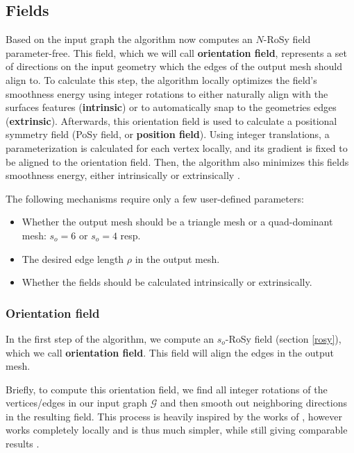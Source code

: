 \documentclass{ACGSeminar}
\begin{document}
\subsection{Fields}
Based on the input graph the algorithm now computes an $N$-RoSy field parameter-free. This field, which we will call \textbf{orientation field}, represents a set of directions on the input geometry which the edges of the output mesh should align to. To calculate this step, the algorithm locally optimizes the field's smoothness energy using integer rotations to either naturally align with the surfaces features (\textbf{intrinsic}) or to automatically snap to the geometries edges (\textbf{extrinsic}). Afterwards, this orientation field is used to calculate a positional symmetry field (PoSy field, or \textbf{position field}). Using integer translations, a parameterization is calculated for each vertex locally, and its gradient is fixed to be aligned to the orientation field. Then, the algorithm also minimizes this fields smoothness energy, either intrinsically or extrinsically \cite{jakob2015instant}.\bigskip

The following mechanisms require only a few user-defined parameters:
\begin{itemize}
	\item	Whether the output mesh should be a triangle mesh or a quad-dominant mesh: $s_o = 6$ or $s_o = 4$ resp.
	\item	The desired edge length $\rho$ in the output mesh.
	\item	Whether the fields should be calculated intrinsically or extrinsically.
\end{itemize}

\subsubsection{Orientation field}\label{orientation-field}
In the first step of the algorithm, we compute an $s_o$-RoSy field (section \ref{rosy}), which we call \textbf{orientation field}. This field will align the edges in the output mesh.\bigskip

Briefly, to compute this orientation field, we find all integer rotations of the vertices/edges in our input graph $\mathcal{G}$ and then smooth out neighboring directions in the resulting field. This process is heavily inspired by the works of \cite{bommes2009mixed,ray2008n}, however works completely locally and is thus much simpler, while still giving comparable results \cite{jakob2015instant}.
\end{document}

